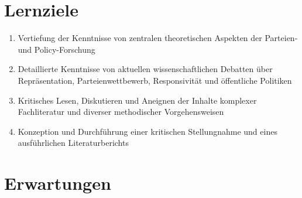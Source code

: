 \documentclass[abstract=on,parskip=full,headings=standardclasses,fontsize=11pt,paper=a4]{scrartcl}
\begin{document}
\section*{Lernziele}

\begin{enumerate}
\item Vertiefung der Kenntnisse von zentralen theoretischen Aspekten der Parteien- und Policy-Forschung
\item Detaillierte Kenntnisse von aktuellen wissenschaftlichen Debatten über Repräsentation, Parteienwettbewerb, Responsivität und öffentliche Politiken
\item  Kritisches Lesen, Diskutieren und Aneignen der Inhalte komplexer Fachliteratur und diverser methodischer Vorgehensweisen
\item Konzeption und Durchführung einer kritischen Stellungnahme und eines ausführlichen Literaturberichts
\end{enumerate}

\section*{Erwartungen}
\end{document}
